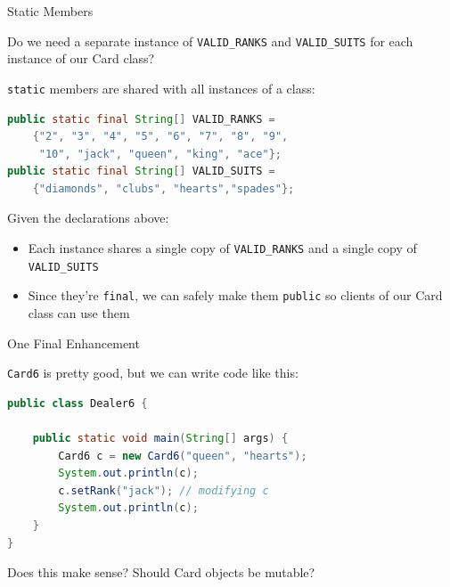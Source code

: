 \documentclass{beamer}
\begin{document}
\begin{frame}[fragile]{Static Members}


Do we need a separate instance of {\tt VALID\_RANKS} and {\tt VALID\_SUITS} for each instance of our Card class?

{\tt static} members are shared with all instances of a class:
\begin{lstlisting}[language=Java]
public static final String[] VALID_RANKS =
    {"2", "3", "4", "5", "6", "7", "8", "9",
     "10", "jack", "queen", "king", "ace"};
public static final String[] VALID_SUITS =
    {"diamonds", "clubs", "hearts","spades"};
\end{lstlisting}
Given the declarations above:
\begin{itemize}
\item Each instance shares a single copy of {\tt VALID\_RANKS} and a single copy of {\tt VALID\_SUITS}
\item Since they're {\tt final}, we can safely make them {\tt public} so clients of our Card class can use them
\end{itemize}

\end{frame}

\begin{frame}[fragile]{One Final Enhancement}

{\tt Card6} is pretty good, but we can write code like this:

\begin{lstlisting}[language=Java]
public class Dealer6 {

    public static void main(String[] args) {
        Card6 c = new Card6("queen", "hearts");
        System.out.println(c);
        c.setRank("jack"); // modifying c
        System.out.println(c);
    }
}
\end{lstlisting}
Does this make sense?  Should Card objects be mutable?

\end{frame}
\end{document}
